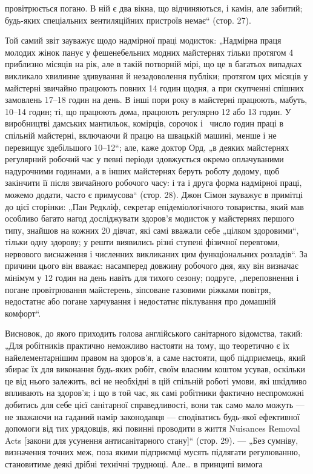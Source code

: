 \parcont{}  %
провітрюється погано. В ній є два вікна, що відчиняються, і камін,
але забитий; будь-яких спеціальних вентиляційних пристроїв немає“ (стор. 27).

Той самий звіт зауважує щодо надмірної праці модисток:
„Надмірна праця молодих жінок панує у фешенебельних модних майстернях тільки протягом 4 приблизно
місяців на рік,
але в такій потворній мірі, що це в багатьох випадках викликало хвилинне здивування й незадоволення
публіки; протягом
цих місяців у майстерні звичайно працюють повних 14 годин
щодня, а при скупченні спішних замовлень 17--18 годин на день.
В інші пори року в майстерні працюють, мабуть, 10--14 годин;
ті, що працюють дома, працюють регулярно 12 або 13 годин.
У виробництві дамських мантильок, комірців, сорочок і~
число годин праці в спільній майстерні, включаючи й працю на
швацькій машині, менше і не перевищує здебільшого 10--12“;
але, каже доктор Орд, „в деяких майстернях регулярний робочий час у певні періоди здовжується окремо
оплачуваними надурочними годинами, а в інших майстернях беруть роботу додому, щоб закінчити її після
звичайного робочого часу: і та
і друга форма надмірної праці, можемо додати, часто є примусова“ (стор. 28). Джон Сімон зауважує в
примітці до цієї сторінки: „Пан Редкліф, секретар епідеміологічного товариства,
який мав особливо багато нагод досліджувати здоров’я модисток
у майстернях першого типу, знайшов на кожних 20 дівчат, які
самі вважали себе „цілком здоровими“, тільки одну здорову;
у решти виявились різні ступені фізичної перевтоми, нервового
виснаження і численних викликаних цим функціональних розладів“.
За причини цього він вважає: насамперед довжину робочого
дня, яку він визначає мінімум у 12 годин на день навіть для
тихого сезону; подруге, „переповнення і погане провітрювання
майстерень, зіпсоване газовими ріжками повітря, недостатнє
або погане харчування і недостатнє піклування про домашній
комфорт“.

Висновок, до якого приходить голова англійського санітарного відомства, такий: „Для робітників
практично неможливо
настояти на тому, що теоретично є їх найелементарнішим правом
на здоров’я, а саме настояти, щоб підприємець, який збирає
їх для виконання будь-яких робіт, своїм власним коштом усував,
оскільки це від нього залежить, всі не необхідні в цій спільній
роботі умови, які шкідливо впливають на здоров’я; і що в той
час, як самі робітники фактично неспроможні добитись для себе
цієї санітарної справедливості, вони так само мало можуть —
не зважаючи на гаданий намір законодавця — сподіватись будь-якої ефективної допомоги від тих
урядовців, які повинні проводити в життя Nuisances Removal Acts [закони для усунення антисанітарного
стану]“ (стор. 29). — „Без сумніву, визначення точних меж, поза якими підприємці мусять підлягати
регулюванню, становитиме деякі дрібні технічні труднощі. Але\dots{} в принципі вимога
\parbreak{}  %
